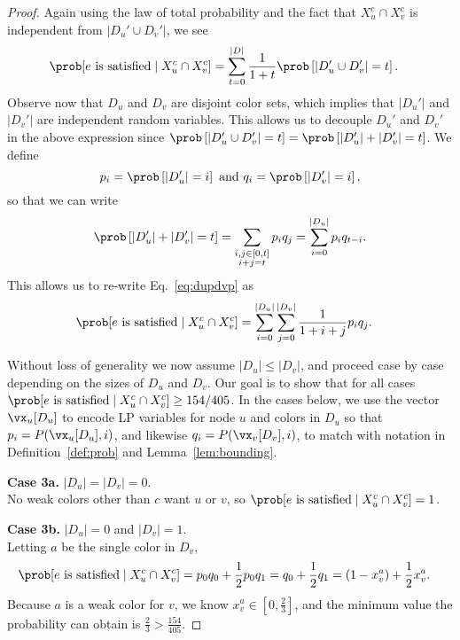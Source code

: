 \begin{proof}
	Again using the law of total probability and the fact that $X_u^c \cap X_v^c$ is independent from $|D_u' \cup D_v'|$, we see
	\begin{align}
		\label{eq:dupdvp}
		\prob[ e & \text{ is satisfied} \mid X_u^c \cap X_v^c ]
		= \sum_{t = 0}^{|D|} \frac{1}{1+t} \prob\left[ |D'_u \cup D'_v| = t \right].
	\end{align}
	Observe now that $D_u$ and $D_v$ are disjoint color sets, which implies that $|D_u'|$ and $|D_v'|$ are independent random variables. This allows us to decouple $D_u'$ and $D_v'$ in the above expression since $\prob\left[ |D'_u \cup D'_v| = t \right] = \prob\left[ |D'_u| + |D'_v| = t \right]$. We define
	\[
		p_i = \prob\left[ |D'_u| = i \right] \text{ and } q_i = \prob\left[ |D'_v| = i \right],
	\]
	so that we can write
	\[
		\prob\left[ |D'_u| + |D'_v| = t \right] = \sum_{\substack{i, j \in [0, t] \\ i + j = t}} p_i q_j = \sum_{i = 0}^{|D_u|} p_i q_{t-i} .
	\]
	This allows us to re-write Eq.~\eqref{eq:dupdvp} as
	\begin{align}
		\label{eq:decoupled}
		\prob[ e \text{ is satisfied} \mid X_u^c \cap X_v^c ] & = \sum_{i = 0}^{|D_u|} \sum_{j = 0}^{|D_v|} \frac{1}{1+i+j} p_i q_j.
	\end{align}

	Without loss of generality we now assume $|D_u| \leq |D_v|$, and proceed case by case depending on the sizes of $D_u$ and $D_v$.
	Our goal is to show that for all cases $\prob[ e \text{ is satisfied} \mid X_u^c \cap X_v^c ] \geq 154/405$.
	In the cases below, we use the vector $\vx_u[D_u]$ to encode LP variables for node $u$ and colors in $D_u$ so that $p_i = P(\vx_u[D_u], i)$, and likewise $q_i = P(\vx_v[D_v], i)$, to match with notation in Definition~\ref{def:prob} and Lemma~\ref{lem:bounding}.

	\bigbreak

	\noindent
	\textbf{Case 3a.} $|D_u| = |D_v| = 0$. \\
	No weak colors other than $c$ want $u$ or $v$, so $\prob[ e \text{ is satisfied} \mid X_u^c \cap X_v^c ] = 1$.

	\bigbreak

	\noindent
	\textbf{Case 3b.} $|D_u| = 0$ and $|D_v| = 1$. \\
	Letting $a$ be the single color in $D_v$,
	\begin{align*}
		\prob[ e \text{ is satisfied} \mid X_u^c \cap X_v^c ] & = p_0 q_0 + \frac{1}{2} p_0 q_1 = q_0 + \frac{1}{2} q_1 = (1 - x_v^a) + \frac{1}{2} x_v^a.
	\end{align*}
	Because $a$ is a weak color for $v$, we know $x_v^a \in [0, \frac{2}{3}]$, and the minimum value the probability can obtain is $\frac{2}{3} > \frac{154}{405}$.


\end{proof}
